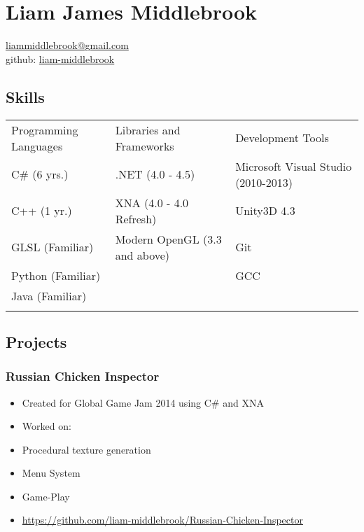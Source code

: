 \documentclass[a4paper,12pt]{article}
\begin{document}
\section{Liam James Middlebrook}\label{liam-james-middlebrook}

\href{mailto:liammiddlebrook@gmail.com}{liammiddlebrook@gmail.com}\\
github: \href{https://github.com/liam-middlebrook}{liam-middlebrook}

\subsection{Skills}\label{skills}

\begin{longtable}[c]{@{}lll@{}}
\toprule\addlinespace
Programming Languages & Libraries and Frameworks & Development Tools
\\\addlinespace
\midrule\endhead
C\# (6 yrs.) & .NET (4.0 - 4.5) & Microsoft Visual Studio (2010-2013)
\\\addlinespace
C++ (1 yr.) & XNA (4.0 - 4.0 Refresh) & Unity3D 4.3
\\\addlinespace
GLSL (Familiar) & Modern OpenGL (3.3 and above) & Git
\\\addlinespace
Python (Familiar) & & GCC
\\\addlinespace
Java (Familiar) & &
\\\addlinespace
\bottomrule
\end{longtable}

\subsection{Projects}\label{projects}

\subsubsection{Russian Chicken
Inspector}\label{russian-chicken-inspector}

\begin{itemize}
\itemsep1pt\parskip0pt
\item
  Created for Global Game Jam 2014 using C\# and XNA
\item
  Worked on:
\item
  Procedural texture generation
\item
  Menu System
\item
  Game-Play
\item
  \url{https://github.com/liam-middlebrook/Russian-Chicken-Inspector}
\end{itemize}
\end{document}
